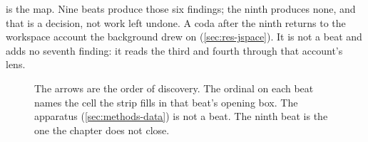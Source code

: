 \noindent
{} is the map. Nine beats produce those six findings; the ninth
produces none, and that is a decision, not work left undone. A coda after the
ninth returns to the workspace account the background drew on
(\cref{sec:res-jspace}). It is not a beat and adds no seventh finding: it reads
the third and fourth through that account's lens.

\begin{figure}[htbp]
\begin{fullwidth}\raggedright

\caption[The investigation in nine beats]{ The arrows are the order of
discovery. The ordinal on each beat names the cell the strip fills in that
beat's opening box. The apparatus (\cref{sec:methods-data}) is not a beat. The ninth beat is the one the
chapter does not close.}
\label{fig:timeline}
\end{fullwidth}
\end{figure}






